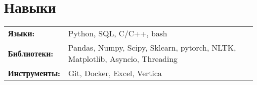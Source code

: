 \documentclass[letterpaper,10pt]{article}
\begin{document}
  


\section{Навыки}
 \begin{tabular}{ll}
 \textbf{Языки:} & \quad Python, SQL, C/C++, bash
 \\ 
 \textbf{Библиотеки:} & \quad Pandas, Numpy, Scipy, Sklearn, pytorch, NLTK, Matplotlib, Asyncio, Threading \\ 
 \textbf{Инструменты:} & \quad Git, Docker, Excel, Vertica\\ 
\end{tabular}
\end{document}
